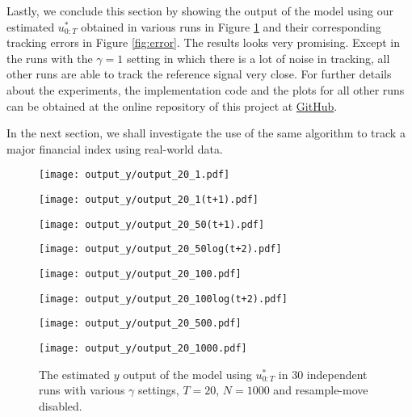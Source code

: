 Lastly, we conclude this section by showing the output of the model using our estimated $u^*_{0:T}$ obtained in various runs in Figure \ref{fig:estimatedy} and their corresponding tracking errors in Figure \ref{fig:error}. The results looks very promising. Except in the runs with the $\gamma=1$ setting in which there is a lot of noise in tracking, all other runs are able to track the reference signal very close. For further details about the experiments, the implementation code and the plots for all other runs can be obtained at the online repository of this project at \href{https://github.com/yowtzu/mscproj}{GitHub}.

In the next section, we shall investigate the use of the same algorithm to track a major financial index using real-world data. 

\begin{figure}[!thbp]
    \centering
    \begin{minipage}{.5\textwidth}
        \centering
        \texttt{[image: output\_y/output\_20\_1.pdf]}
    \end{minipage}%
    \begin{minipage}{0.5\textwidth}
        \centering
        \texttt{[image: output\_y/output\_20\_1(t+1).pdf]}
    \end{minipage}
    \begin{minipage}{0.5\textwidth}
        \centering
        \texttt{[image: output\_y/output\_20\_50(t+1).pdf]}
    \end{minipage}%
    \begin{minipage}{0.5\textwidth}
        \centering
        \texttt{[image: output\_y/output\_20\_50log(t+2).pdf]}
    \end{minipage}
    \begin{minipage}{0.5\textwidth}
        \centering
        \texttt{[image: output\_y/output\_20\_100.pdf]}
    \end{minipage}%
    \begin{minipage}{0.5\textwidth}
        \centering
        \texttt{[image: output\_y/output\_20\_100log(t+2).pdf]}
    \end{minipage}
    \begin{minipage}{0.5\textwidth}
        \centering
        \texttt{[image: output\_y/output\_20\_500.pdf]}
    \end{minipage}%
    \begin{minipage}{0.5\textwidth}
        \centering
        \texttt{[image: output\_y/output\_20\_1000.pdf]}
    \end{minipage}
    \caption{The estimated $y$ output of the model using $u^*_{0:T}$ in 30 independent runs with various $\gamma$ settings, $T=20$, $N=1000$ and resample-move disabled.}
    \label{fig:estimatedy}
\end{figure}


